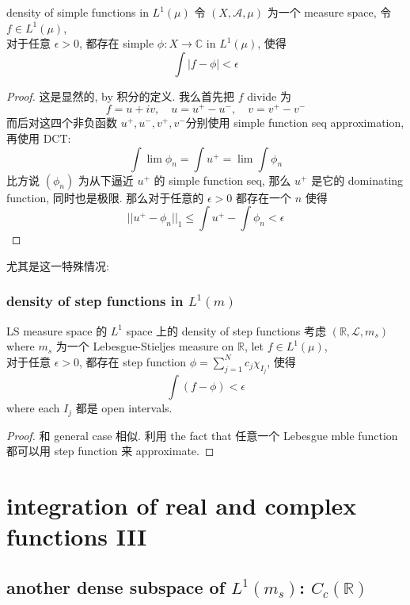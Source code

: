 \documentclass[lang=cn,11pt]{elegantbook}
\begin{document}
\begin{theorem}{density of simple functions in $L^1(\mu)$}
  令 $(X, \mathcal{A}, \mu)$ 为一个 measure space,  令 $f \in L^1(\mu)$, \\
    对于任意 $\epsilon > 0$, 都存在 simple $\phi: X \rightarrow \mathbb{C}$ in $L^1(\mu)$, 使得 \[
    \int |f - \phi| 
< \epsilon
    \]
\end{theorem}
\begin{proof}
    这是显然的, by 积分的定义. 我么首先把 $f$ divide 为 \[
    f = u +iv, \quad u = u^+ - u^-,\quad v = v^+ - v^-
    \]
    而后对这四个非负函数 $u^+,u^-, v^+, v^-$分别使用 simple function seq approximation, 再使用 DCT:
    \[
   \int \lim \phi_n =     \int u^+ =  \lim \int \phi_n
    \]
    比方说 $(\phi_n)$ 为从下逼近 $u^+$ 的 simple function seq, 那么 $u^+$ 是它的 dominating function, 同时也是极限. 那么对于任意的 $\epsilon > 0$ 都存在一个 $n$ 使得  \[
||u^+ - \phi_n||_1 \leq  \int u^+ -    \int \phi_n  < \epsilon
    \]
\end{proof}


尤其是这一特殊情况: 
\subsection{density of step functions in $L^1(m)$ }
\begin{theorem}{LS measure space 的 $L^1$ space 上的 density of step functions}
考虑 $(\mathbb{R}, \mathcal{L}, m_s)$ where $m_s$ 为一个 Lebesgue-Stieljes measure on $\mathbb{R}$, let $f \in L^1 (\mu)$,\\
对于任意 $\epsilon >0$, 都存在 step function $\phi = \sum_{j=1}^N c_j \chi_{I_j}$, 使得 \[
\int (f-\phi) < \epsilon
\] where each $I_j$ 都是 open intervals.
\end{theorem}
\begin{proof}
和 general case 相似. 利用 the fact that 任意一个 Lebesgue mble function 都可以用 step function 来 approximate.
\end{proof}







\chapter{integration of real and complex functions III}
\section{another dense subspace of $L^1(m_s)$: $C_c (\mathbb{R})$}
\end{document}
